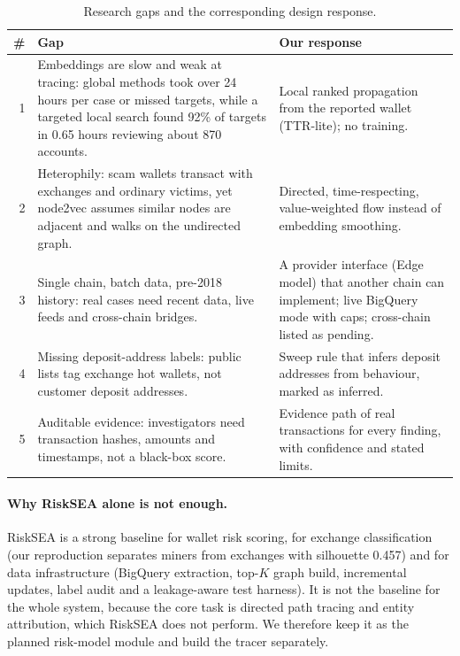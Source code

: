 \begin{table}[H]
\centering\small\singlespacing
\begin{tabular}{r p{6.0cm} p{6.0cm}}
\toprule
\textbf{\#} & \textbf{Gap} & \textbf{Our response}\\
\midrule
1 & Embeddings are slow and weak at tracing: global methods took over 24 hours per case or missed targets, while a targeted local search found 92\% of targets in 0.65 hours reviewing about 870 accounts. & Local ranked propagation from the reported wallet (TTR-lite); no training.\\
2 & Heterophily: scam wallets transact with exchanges and ordinary victims, yet node2vec assumes similar nodes are adjacent and walks on the undirected graph. & Directed, time-respecting, value-weighted flow instead of embedding smoothing.\\
3 & Single chain, batch data, pre-2018 history: real cases need recent data, live feeds and cross-chain bridges. & A provider interface (Edge model) that another chain can implement; live BigQuery mode with caps; cross-chain listed as pending.\\
4 & Missing deposit-address labels: public lists tag exchange hot wallets, not customer deposit addresses. & Sweep rule that infers deposit addresses from behaviour, marked as inferred.\\
5 & Auditable evidence: investigators need transaction hashes, amounts and timestamps, not a black-box score. & Evidence path of real transactions for every finding, with confidence and stated limits.\\
\bottomrule
\end{tabular}
\caption{Research gaps and the corresponding design response.}
\label{tab:gaps}
\end{table}

\paragraph{Why RiskSEA alone is not enough.} RiskSEA is a strong baseline for wallet risk scoring, for exchange classification (our reproduction separates miners from exchanges with silhouette 0.457) and for data infrastructure (BigQuery extraction, top-$K$ graph build, incremental updates, label audit and a leakage-aware test harness). It is not the baseline for the whole system, because the core task is directed path tracing and entity attribution, which RiskSEA does not perform. We therefore keep it as the planned risk-model module and build the tracer separately.

